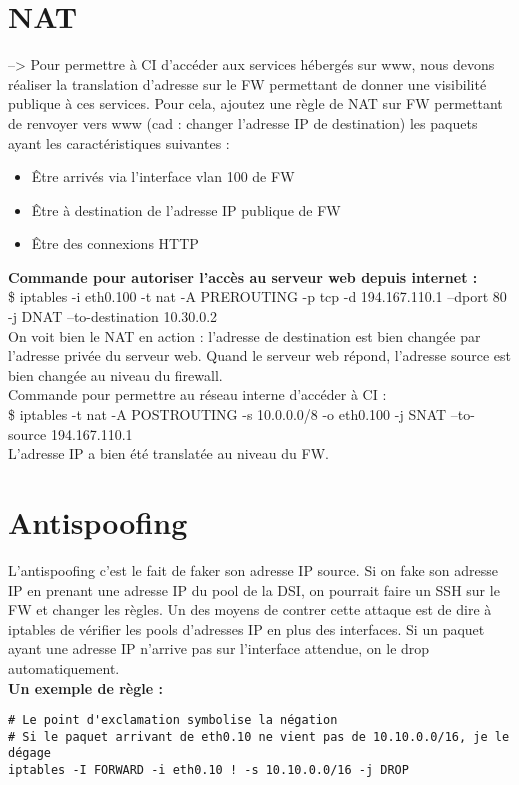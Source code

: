 \documentclass[a4paper]{article}
\begin{document}
	\section{NAT}
\noindent
--> Pour permettre à CI d'accéder aux services hébergés sur www, nous devons réaliser la translation d'adresse sur le FW permettant de donner une visibilité publique à ces services. Pour cela, ajoutez une règle de NAT sur FW permettant de renvoyer vers www (cad : changer l'adresse IP de destination) les paquets ayant les caractéristiques suivantes : \\
\begin{itemize}
	\item Être arrivés via l'interface vlan 100 de FW \\
	\item Être à destination de l'adresse IP publique de FW \\
	\item Être des connexions HTTP \\
\end{itemize}

\textbf{Commande pour autoriser l'accès au serveur web depuis internet :} \\
\$ iptables -i eth0.100 -t nat -A PREROUTING -p tcp -d 194.167.110.1 --dport 80 -j DNAT --to-destination 10.30.0.2 \\

On voit bien le NAT en action : l'adresse de destination est bien changée par l'adresse privée du serveur web. Quand le serveur web répond, l'adresse source est bien changée au niveau du firewall.  \\

Commande pour permettre au réseau interne d'accéder à CI : \\
\$ iptables -t nat -A POSTROUTING -s 10.0.0.0/8 -o eth0.100 -j SNAT --to-source 194.167.110.1 \\

L'adresse IP a bien été translatée au niveau du FW. \\


	\section{Antispoofing}

L'antispoofing c'est le fait de faker son adresse IP source. Si on fake son adresse IP en prenant une adresse IP du pool de la DSI, on pourrait faire un SSH sur le FW et changer les règles. Un des moyens de contrer cette attaque est de dire à iptables de vérifier les pools d'adresses IP en plus des interfaces. Si un paquet ayant une adresse IP n'arrive pas sur l'interface attendue, on le drop automatiquement.	 \\

\textbf{Un exemple de règle :}
\begin{verbatim}
# Le point d'exclamation symbolise la négation
# Si le paquet arrivant de eth0.10 ne vient pas de 10.10.0.0/16, je le dégage
iptables -I FORWARD -i eth0.10 ! -s 10.10.0.0/16 -j DROP
\end{verbatim}
\end{document}

